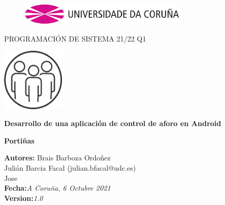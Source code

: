 \documentclass[a4paper,openright,12pt]{article}
\begin{document}
\begin{titlepage}

\begin{center}
\vspace*{-1in}
\begin{figure}[htb]
\begin{center}
\includegraphics[width=8cm]{udc.eps}
\end{center}
\end{figure}

\vspace*{1in}
PROGRAMACIÓN DE SISTEMA 21/22 Q1\\
\begin{center}
\includegraphics[width=3cm,height=3cm]{ejemplo.jpg}
\end{center}
\vspace*{10mm}
\begin{Large}
\textbf{Desarrollo de una aplicación de control de aforo en Android} \\
\end{Large}
\vspace*{10mm}
\begin{Large}
\textbf{Portiñas} \\
\end{Large}

\vspace*{3in}
\begin{large}
\raggedleft
\textbf{Autores:} Brais Barboza Ordoñez\\
Julián Barcia Facal (julian.bfacal@udc.es) \\
Jose \\
\textbf{Fecha:}\textit{A Coruña, 6 Octubre 2021}\\
\textbf{Version:}\textit{1.0}\\

\end{large}

\end{center}
\end{titlepage} 
\end{document}
